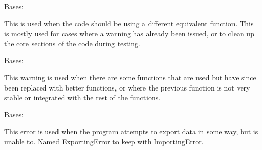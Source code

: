 \documentclass[letterpaper,10pt,english]{sphinxmanual}
\begin{document}

\begin{fulllineitems}
\label{\detokenize{python_docstrings/IfA_Smeargle.meta.errors:IfA_Smeargle.meta.errors.DeprecatedError}}
Bases: {\hyperref[\detokenize{python_docstrings/IfA_Smeargle.meta.errors:IfA_Smeargle.meta.errors.Smeargle_BaseException}]{}}

This is used when the code should be using a different equivalent function.
This is mostly used for cases where a warning has already been issued, or
to clean up the core sections of the code during testing.

\end{fulllineitems}


\begin{fulllineitems}
\label{\detokenize{python_docstrings/IfA_Smeargle.meta.errors:IfA_Smeargle.meta.errors.DeprecatedWarning}}
Bases: {\hyperref[\detokenize{python_docstrings/IfA_Smeargle.meta.errors:IfA_Smeargle.meta.errors.Smeargle_Warning}]{}}

This warning is used when there are some functions that are used but
have since been replaced with better functions, or where the previous
function is not very stable or integrated with the rest of the functions.

\end{fulllineitems}


\begin{fulllineitems}
\label{\detokenize{python_docstrings/IfA_Smeargle.meta.errors:IfA_Smeargle.meta.errors.ExportingError}}
Bases: {\hyperref[\detokenize{python_docstrings/IfA_Smeargle.meta.errors:IfA_Smeargle.meta.errors.Smeargle_Exception}]{}}

This error is used when the program attempts to export data in some way,
but is unable to. Named ExportingError to keep with ImportingError.

\end{fulllineitems}
\end{document}
